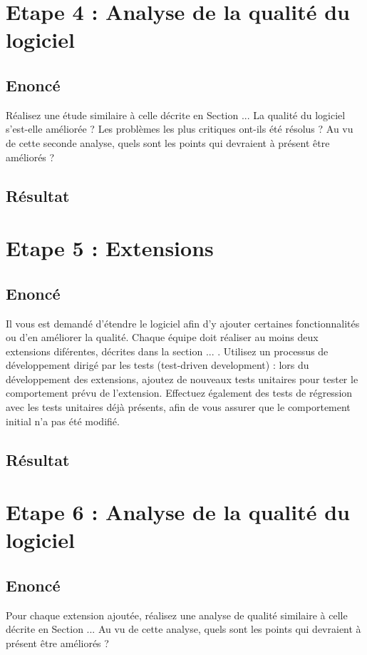 \documentclass[12pt,a4paper,final]{article}
\begin{document}
\section{Etape 4 : Analyse de la qualité du logiciel}\label{sec:etape4}
\subsection{Enoncé}
Réalisez une étude similaire à celle décrite en Section ... La qualité du logiciel s'est-elle améliorée ? Les problèmes les plus critiques ont-ils été résolus ? Au vu de cette seconde analyse, quels sont les points qui devraient à présent être améliorés ?
\subsection{Résultat}



\section{Etape 5 : Extensions}\label{sec:etape5}
\subsection{Enoncé} 
Il vous est demandé d'étendre le logiciel afin d'y ajouter certaines fonctionnalités ou d'en améliorer la qualité. Chaque équipe doit réaliser au moins deux extensions diférentes, décrites dans la section ... .
Utilisez un processus de développement dirigé par les tests (test-driven development) : lors du développement des extensions, ajoutez de nouveaux tests unitaires pour tester le comportement prévu de l'extension. Effectuez également des tests de régression avec les tests unitaires déjà présents, afin de vous assurer que le comportement initial n'a pas été modifié.
\subsection{Résultat}



\section{Etape 6 : Analyse de la qualité du logiciel}\label{sec:etape6}
\subsection{Enoncé} 
Pour chaque extension ajoutée, réalisez une analyse de qualité similaire à celle décrite en Section ... Au vu de cette analyse, quels sont les points qui devraient à présent être améliorés ?
\end{document}
